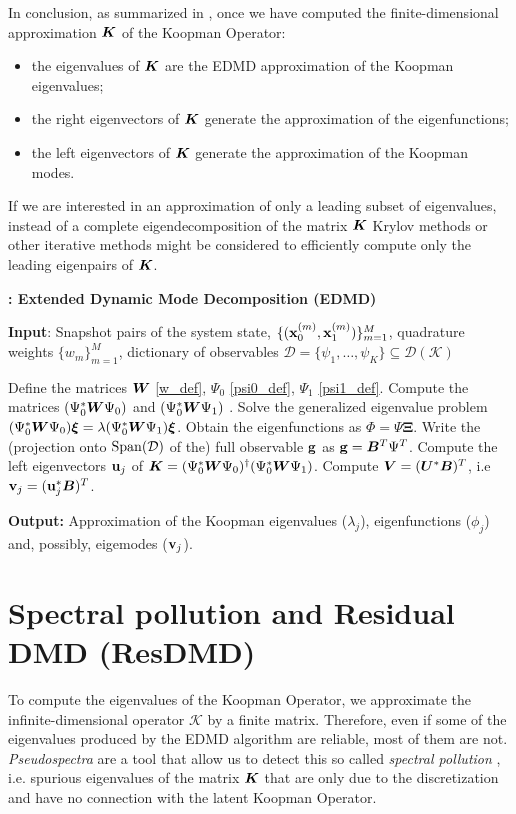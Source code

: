 In conclusion, as summarized in ,  once we have computed the finite-dimensional approximation $\vb*{K}$ of the Koopman Operator:
\begin{itemize}
    \item the eigenvalues of $\vb*{K}$ are the EDMD approximation of the Koopman eigenvalues;
    \item the right eigenvectors of $\vb*{K}$ generate the approximation of the eigenfunctions;
    \item the left eigenvectors of $\vb*{K}$ generate the approximation of the Koopman modes.
\end{itemize}
If we are interested in an approximation of only a leading subset of eigenvalues, instead of a complete eigendecomposition of the matrix $\vb*{K}$ Krylov methods or other iterative methods might be considered to efficiently compute only the leading eigenpairs of $\vb*{K}$.

\begin{algorithm}
\caption{\textbf{: Extended Dynamic Mode Decomposition (EDMD)}}
\label{alg_edmd}
\textbf{Input}: Snapshot pairs of the system state, $\{(\vb{x}_0^{(m)}, \vb{x}_1^{(m)})\}_{m = 1}^M$, quadrature weights $\{w_m\}_{m = 1}^M$, dictionary of observables $\mathcal{D} = \{\psi_1, \dots, \psi_K\} \subseteq \mathcal{D}(\mathcal{K})$
\begin{algorithmic}[1]
\State Define the matrices $\vb*{W}$ \eqref{w_def}, $\Psi_0$ \eqref{psi0_def}, $\Psi_1$ \eqref{psi1_def}. 
\State Compute the matrices $(\Psi_0^*\vb*{W}\Psi_0)$ and $(\Psi_0^*\vb*{W}\Psi_1)$ .
\State Solve the generalized eigenvalue problem $(\Psi_0^*\vb*{W}\Psi_0)\bm{\xi} = \lambda(\Psi_0^*\vb*{W}\Psi_1)\bm{\xi}$.
\State Obtain the eigenfunctions as $\Phi = \Psi\bm{\Xi}$.
    \State Write the (projection onto $\mathrm{Span}(\mathcal{D})$ of the) full observable $\vb{g}$ as $\vb{g} = \vb*{B}^T\Psi^T$.
    \State Compute the left eigenvectors $\vb{u}_j$ of $\vb*{K} = (\Psi_0^*\vb*{W}\Psi_0)^{\dagger}(\Psi_0^*\vb*{W}\Psi_1)$.
    \State Compute $\vb*{V} = (\vb*{U}^*\vb*{B})^T$, i.e $\vb{v}_j = (\vb{u}_j^*\vb*{B})^T$.
\EndIf
\end{algorithmic}
\textbf{Output:} Approximation of the Koopman eigenvalues ($\lambda_j$), eigenfunctions ($\phi_j$) and, possibly, eigemodes ($\vb{v}_j$).
\end{algorithm}


\section{Spectral pollution and Residual DMD (ResDMD)}
To compute the eigenvalues of the Koopman Operator, we approximate the infinite-dimensional operator $\mathcal{K}$ by a finite matrix. Therefore, even if some of the eigenvalues produced by the EDMD algorithm are reliable, most of them are not. \emph{Pseudospectra} \cite{trefethen_spectra_2005} are a tool that allow us to detect this so called \emph{spectral pollution} \cite{colbrook_rigorous_2021}, i.e. spurious eigenvalues of the matrix $\vb*{K}$ that are only due to the discretization and have no connection with the latent Koopman Operator.

